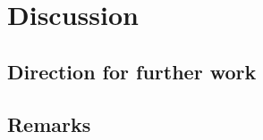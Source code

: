 
\chapter{Discussion}
\label{chapter6}

\section{Direction for further work}

\section{Remarks}








